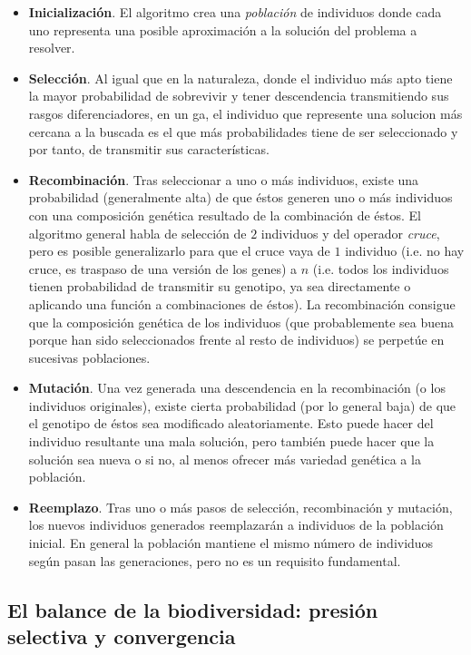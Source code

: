 \begin{itemize}
	\item \textbf{Inicialización}. El algoritmo crea una \textit{población} de individuos donde cada uno representa una posible aproximación a la solución del problema a resolver.
	\item \textbf{Selección}. Al igual que en la naturaleza, donde el individuo más apto tiene la mayor probabilidad de sobrevivir y tener descendencia transmitiendo sus rasgos diferenciadores, en un \gls{ga}, el individuo que represente una solucion más cercana a la buscada es el que más probabilidades tiene de ser seleccionado y por tanto, de transmitir sus características.
	\item \textbf{Recombinación}. Tras seleccionar a uno o más individuos, existe una probabilidad (generalmente alta) de que éstos generen uno o más individuos con una composición genética resultado de la combinación de éstos. El algoritmo general habla de selección de $2$ individuos y del operador \textit{cruce}, pero es posible generalizarlo para que el cruce vaya de $1$ individuo (i.e. no hay cruce, es traspaso de una versión de los genes) a $n$ (i.e. todos los individuos tienen probabilidad de transmitir su genotipo, ya sea directamente o aplicando una función a combinaciones de éstos). La recombinación consigue que la composición genética de los individuos (que probablemente sea buena porque han sido seleccionados frente al resto de individuos) se perpetúe en sucesivas poblaciones.
	\item \textbf{Mutación}. Una vez generada una descendencia en la recombinación (o los individuos originales), existe cierta probabilidad (por lo general baja) de que el genotipo de éstos sea modificado aleatoriamente. Esto puede hacer del individuo resultante una mala solución, pero también puede hacer que la solución sea nueva o si no, al menos ofrecer más variedad genética a la población.
	\item \textbf{Reemplazo}. Tras uno o más pasos de selección, recombinación y mutación, los nuevos individuos generados reemplazarán a individuos de la población inicial. En general la población mantiene el mismo número de individuos según pasan las generaciones, pero no es un requisito fundamental.
\end{itemize}

\subsection{El balance de la biodiversidad: presión selectiva y convergencia}

